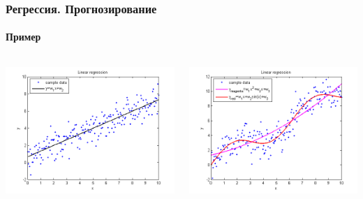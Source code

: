 \documentclass[xcolor=table]{beamer}
\begin{document}
\begin{frame}
  \frametitle{Регрессия. Прогнозирование}
  \framesubtitle{Пример}

  \begin{columns}
    \begin{column}{0.5\textwidth}
      {\includegraphics[scale=0.33]{data/regr1.png}}
    \end{column}

    \begin{column}{0.5\textwidth}
      {\includegraphics[scale=0.33]{data/regr2.png}}
    \end{column}
  \end{columns}
\end{frame}
\end{document}
